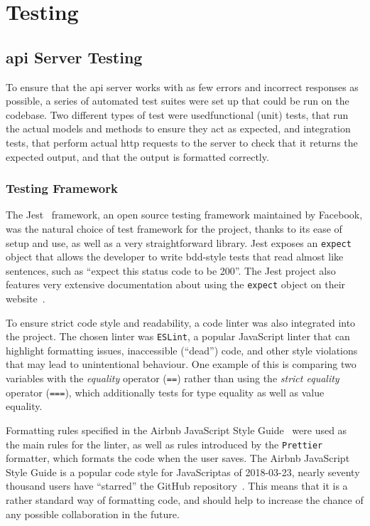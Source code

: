 \chapter{Testing}

\section{\acrshort{api} Server Testing}

To ensure that the \acrshort{api} server works with as few errors and
incorrect responses as possible, a series of automated test suites were set
up that could be run on the codebase. Two different types of test were
used\textemdash{}functional (unit) tests, that run the actual models and
methods to ensure they act as expected, and integration tests, that perform
actual \acrshort{http} requests to the server to check that it returns the
expected output, and that the output is formatted correctly.

\subsection{Testing Framework}
The Jest~\cite{jest} framework, an open source testing framework maintained
by Facebook, was the natural choice of test framework for the project, thanks
to its ease of setup and use, as well as a very straightforward library. Jest
exposes an \texttt{expect} object that allows the developer to write
\acrfull{bdd}-style tests that read almost like sentences, such as ``expect
this status code to be 200''. The Jest project also features very extensive
documentation about using the \texttt{expect} object on their
website~\cite{jest-expect}.

To ensure strict code style and readability, a code linter was also
integrated into the project. The chosen linter was \texttt{ESLint}, a popular
JavaScript linter that can highlight formatting issues, inaccessible
(``dead'') code, and other style violations that may lead to unintentional
behaviour. One example of this is comparing two variables with the
\textit{equality} operator (\texttt{==}) rather than using the \textit{strict
equality} operator (\texttt{===}), which additionally tests for type equality
as well as value equality.

Formatting rules specified in the Airbnb JavaScript Style
Guide~\cite{airbnb-javascript} were used as the main rules for the linter, as
well as rules introduced by the \texttt{Prettier} formatter, which formats
the code when the user saves. The Airbnb JavaScript Style Guide is a popular
code style for JavaScript\textemdash{}as of 2018-03-23, nearly seventy
thousand users have ``starred'' the GitHub
repository~\cite{airbnb-javascript}. This means that it is a rather standard
way of formatting code, and should help to increase the chance of any
possible collaboration in the future.

